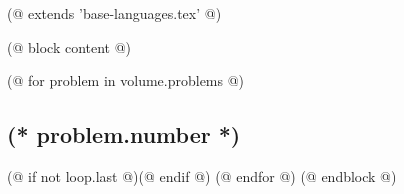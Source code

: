 (@ extends 'base-languages.tex' @)

(@ block content @)

    \pagestyle{online}

    (@ for problem in volume.problems @)%
        \setcounter{volume}{(* volume.number *)}%
        \setcounter{problem}{(* problem.number *)}%
        \subsection{\texorpdfstring{(* problem.number *)}{(* problem.number *). (* problem.id *)}}%
        \label{ssc:problem-(* problem.id*)}%
        \ifstrequal{(* language.id *)}{persian}{\arabicfont\setRL}{}
        \ifstrequal{(* language.id *)}{persian}{\unsetRL}{}
        (@ if not loop.last @)\newpage(@ endif @)
    (@ endfor @)
    \newpage
(@ endblock @)
